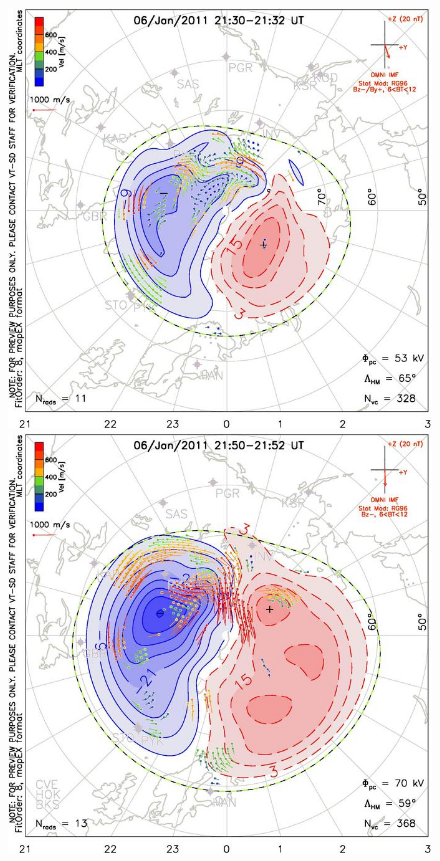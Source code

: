 \documentclass[norsk,a4paper,12pt]{article}
\begin{document}
\begin{figure}[H]
\includegraphics[scale = 1.1]{Figures/Superdarn/superdarn_21_30.jpg}
\includegraphics[scale = 1.1]{Figures/Superdarn/superdarn_21_52.jpg}

\end{figure}
\end{document}
